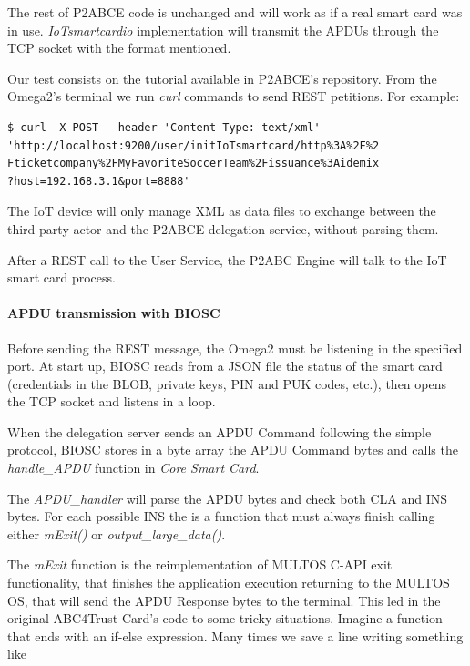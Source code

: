 The rest of P2ABCE code is unchanged and will work as if a real smart card was in use. \textit{IoTsmartcardio} implementation will transmit the APDUs through the TCP socket with the format mentioned.


\hfil

Our test consists on the tutorial available in P2ABCE's repository. From the Omega2's terminal we run \textit{curl} commands to send REST petitions. For example:

\begin{verbatim}
$ curl -X POST --header 'Content-Type: text/xml'
'http://localhost:9200/user/initIoTsmartcard/http%3A%2F%2
Fticketcompany%2FMyFavoriteSoccerTeam%2Fissuance%3Aidemix
?host=192.168.3.1&port=8888'
\end{verbatim}

The IoT device will only manage XML as data files to exchange between the third party actor and the P2ABCE delegation service, without parsing them.

After a REST call to the User Service, the P2ABC Engine will talk to the IoT smart card process.

\paragraph{APDU transmission with BIOSC}


Before sending the REST message, the Omega2 must be listening in the specified port. At start up, BIOSC reads from a JSON file the status of the smart card (credentials in the BLOB, private keys, PIN and PUK codes, etc.), then opens the TCP socket and listens in a loop.

When the delegation server sends an APDU Command following the simple protocol, BIOSC stores in a byte array the APDU Command bytes and calls the \textit{handle\_APDU} function in \textit{Core Smart Card}.


The \textit{APDU\_handler} will parse the APDU bytes and check both CLA and INS bytes. For each possible INS the is a function that must always finish calling either \textit{mExit()} or \textit{output\_large\_data()}.

The \textit{mExit} function is the reimplementation of MULTOS C-API exit functionality, that finishes the application execution returning to the MULTOS OS, that will send the APDU Response bytes to the terminal. This led in the original ABC4Trust Card's code to some tricky situations. Imagine a function that ends with an if-else expression. Many times we save a line writing something like

